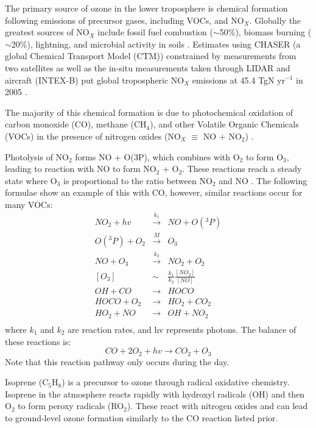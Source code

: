     The primary source of ozone in the lower troposphere is chemical formation following emissions of precursor gases, including VOCs, and NO$_X$.
    Globally the greatest sources of NO$_X$ include fossil fuel combustion ($\sim$50\%), biomass burning ($\sim$20\%), lightning, and microbial activity in soils \citep{Delmas_1997}.
    Estimates using CHASER (a global Chemical Transport Model (CTM)) constrained by measurements from two satellites as well as the in-situ measurements taken through LIDAR and aircraft (INTEX-B) put global tropospheric NO$_X$ emissions at 45.4 TgN yr$^{-1}$ in 2005 \citep{Miyazaki2011}.

    The majority of this chemical formation is due to photochemical oxidation of carbon monoxide (CO), methane (CH$_4$), and other Volatile Organic Chemicals (VOCs) in the presence of nitrogen oxides (NO$_X$ $\equiv$ NO $+$ NO$_2$) \citep{Stevenson2006}.

    Photolysis of NO$_2$ forms NO + O(3P), which combines with O$_2$ to form O$_3$, leading to reaction with NO to form NO$_2$ + O$_2$.
    These reactions reach a steady state where O$_3$ is proportional to the ratio between NO$_2$ and NO \citep{Sillman2002}.
    The following formulae show an example of this with CO, however, similar reactions occur for many VOCs:
    \begin{align}
      NO_2 + hv &\overset{k_1}{\rightarrow}& NO + O({}^3 P) \\
      O({}^3 P) + O_2 &\overset{M}{\rightarrow}& O_3 \\
      NO + O_3 &\overset{k_2}{\rightarrow}& NO_2 + O_2 \\
      \left[O_3\right] &\sim& \frac{k_1}{k_2} \frac{\left[NO_2\right]}{\left[NO\right]} \\
      OH + CO &{\rightarrow}& HOCO \\
      HOCO + O_2 &{\rightarrow}& HO_2 + CO_2 \\
      HO_2 + NO &{\rightarrow}& OH + NO_2 \\
    \end{align}
    where $k_1$ and $k_2$ are reaction rates, and hv represents photons.
    The balance of these reactions is:
    \begin{equation} CO + 2O_2 + hv {\rightarrow} CO_2 + O_3 \end{equation}
    Note that this reaction pathway only occurs during the day.

    Isoprene (C$_5$H$_8$) is a precursor to ozone through radical oxidative chemistry. Isoprene in the atmosphere reacts rapidly with hydroxyl radicals (OH) and then O$_2$ to form peroxy radicals (RO$_2$).
    These react with nitrogen oxides and can lead to ground-level ozone formation similarly to the CO reaction listed prior.

